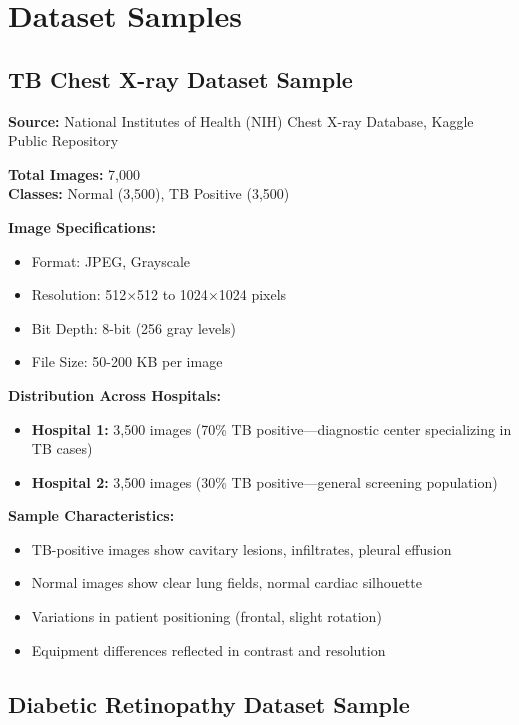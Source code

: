 \section{Dataset Samples}

\subsection{TB Chest X-ray Dataset Sample}

\textbf{Source:} National Institutes of Health (NIH) Chest X-ray Database, Kaggle Public Repository

\textbf{Total Images:} 7,000 \\
\textbf{Classes:} Normal (3,500), TB Positive (3,500)

\textbf{Image Specifications:}
\begin{itemize}
    \item Format: JPEG, Grayscale
    \item Resolution: 512$\times$512 to 1024$\times$1024 pixels
    \item Bit Depth: 8-bit (256 gray levels)
    \item File Size: 50-200 KB per image
\end{itemize}

\textbf{Distribution Across Hospitals:}
\begin{itemize}
    \item \textbf{Hospital 1:} 3,500 images (70\% TB positive—diagnostic center specializing in TB cases)
    \item \textbf{Hospital 2:} 3,500 images (30\% TB positive—general screening population)
\end{itemize}

\textbf{Sample Characteristics:}
\begin{itemize}
    \item TB-positive images show cavitary lesions, infiltrates, pleural effusion
    \item Normal images show clear lung fields, normal cardiac silhouette
    \item Variations in patient positioning (frontal, slight rotation)
    \item Equipment differences reflected in contrast and resolution
\end{itemize}

\subsection{Diabetic Retinopathy Dataset Sample}

